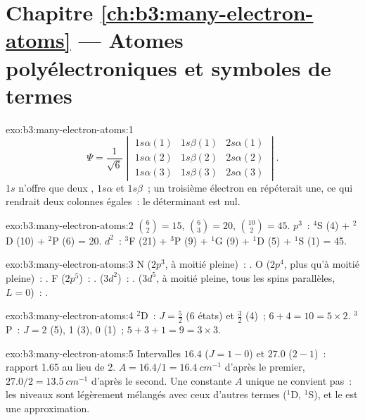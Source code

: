 \section*{Chapitre \ref{ch:b3:many-electron-atoms} --- Atomes polyélectroniques et symboles de termes}

\begin{solution}{exo:b3:many-electron-atoms:1}
\[
\Psi = \frac{1}{\sqrt6}\begin{vmatrix}1s\alpha(1) & 1s\beta(1) & 2s\alpha(1)\\
1s\alpha(2) & 1s\beta(2) & 2s\alpha(2)\\ 1s\alpha(3) & 1s\beta(3) & 2s\alpha(3)
\end{vmatrix}.
\]
$1s$ n'offre que deux , $1s\alpha$ et $1s\beta$~; un troisième
électron en répéterait une, ce qui rendrait deux colonnes égales~: le
déterminant est nul.
\end{solution}

\begin{solution}{exo:b3:many-electron-atoms:2}
$\binom62 = 15$, $\binom63 = 20$, $\binom{10}{2} = 45$. $p^3$~: ${}^4$S (4) +
${}^2$D (10) + ${}^2$P (6) = 20. $d^2$~: ${}^3$F (21) + ${}^3$P (9) + ${}^1$G (9) +
${}^1$D (5) + ${}^1$S (1) = 45.
\end{solution}

\begin{solution}{exo:b3:many-electron-atoms:3}
N ($2p^3$, à moitié pleine)~: . O ($2p^4$, plus qu'à
moitié pleine)~:
. F ($2p^5$)~: .  ($3d^2$)~:
.  ($3d^5$, à moitié pleine, tous les spins
parallèles, $L = 0$)~:
.
\end{solution}

\begin{solution}{exo:b3:many-electron-atoms:4}
${}^2$D~: $J = \frac52$ (6 états) et $\frac32$ (4)~; $6 + 4 = 10 = 5 \times 2$.
${}^3$P~: $J = 2$ (5), 1 (3), 0 (1)~; $5 + 3 + 1 = 9 = 3 \times 3$.
\end{solution}

\begin{solution}{exo:b3:many-electron-atoms:5}
Intervalles $16.4$ ($J = 1 - 0$) et $27.0$ ($2 - 1$)~: rapport 1.65 au lieu
de 2.
$A = 16.4/1 = \qty{16.4}{cm^{-1}}$ d'après le premier, $27.0/2 = \qty{13.5}{cm^{-1}}$
d'après le second. Une constante $A$ unique ne convient pas~: les niveaux
sont légèrement mélangés avec ceux d'autres termes (${}^1$D, ${}^1$S), et
le  est une approximation.
\end{solution}

